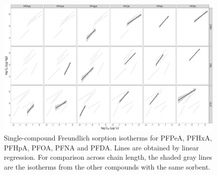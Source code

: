 \begin{landscape}


\begin{figure}[htb]
    \centering
    \includegraphics[height=0.8\textheight]{R/figs/BC_facet_isotherm.pdf}
    \caption{Single-compound Freundlich sorption isotherms for PFPeA, PFHxA, PFHpA, PFOA, PFNA and PFDA. Lines are obtained by linear regression. For comparison across chain length, the shaded gray lines are the isotherms from the other compounds with the same sorbent.}
    \label{fig:sorption_isotherms_all}
\end{figure}

\end{landscape}